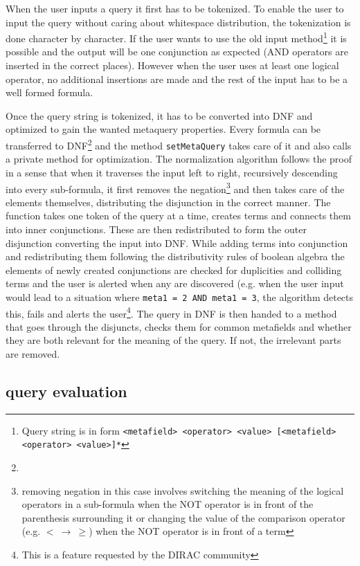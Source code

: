 When the user inputs a query it first has to be tokenized. To enable the user to input the query without caring 
about whitespace distribution, the tokenization is done character by character.
If the user wants to use the old input method\footnote{Query string is in form 
\texttt{<metafield> <operator> <value> [<metafield> <operator> <value>]*}}
it is possible and the output will be one conjunction as expected (AND operators are inserted in the
correct places). However when the user uses at least one logical operator, no additional insertions are made
and the rest of the input has to be a well formed formula. 

Once the query string is tokenized, it has to be converted into DNF and optimized to gain the wanted metaquery 
properties. Every formula can be transferred to DNF\footnote{} and %
the method \texttt{setMetaQuery} takes care of it and also calls a private method for optimization.
The normalization algorithm follows the proof in a sense that when it traverses the input left to right, 
recursively descending into every sub-formula, it first removes the negation\footnote{removing negation in this 
case involves switching the meaning of the logical operators in a sub-formula when the NOT operator is in front of  
the parenthesis surrounding it or changing the value of the comparison operator (e.g. $ < \: \rightarrow \: \geq$) 
when the NOT operator is in front of a term} 
and then takes care of the elements themselves, distributing the disjunction in the correct manner. %
The function takes one token of the query at a time, creates terms and connects them into inner conjunctions. 
These are then redistributed to form the outer disjunction converting the input into DNF. 
While adding terms into conjunction and redistributing them following the distributivity rules of boolean algebra 
the elements of newly created conjunctions are checked for duplicities and colliding terms and the user is alerted 
when any are discovered (e.g. when the user input would lead to a situation where \texttt{meta1 = 2 AND meta1 = 
3}, the algorithm detects this, fails and alerts the user\footnote{This is a feature requested by the DIRAC community}. 
The query in DNF is then handed to a method that goes through the disjuncts, checks them for common metafields 
and whether they are both relevant for the meaning of the query. If not, the irrelevant parts are removed. %

\subsection{query evaluation}

